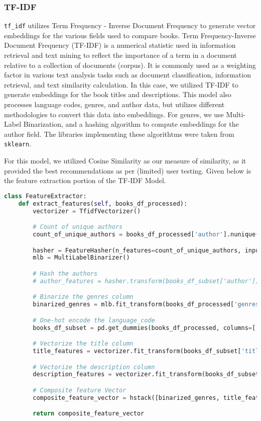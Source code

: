 \subsubsection*{TF-IDF}
\texttt{tf\_idf} utilizes Term Frequency - Inverse Document Frequency to generate vector embeddings for the various fields used to compare books. Term Frequency-Inverse Document Frequency (TF-IDF) is a numerical statistic used in information retrieval and text mining to reflect the importance of a term in a document relative to a collection of documents (corpus). It is commonly used as a weighting factor in various text analysis tasks such as document classification, information retrieval, and text similarity calculation. In this case, we utilized TF-IDF to generate embeddings for the book titles and descriptions. This model also processes language codes, genres, and author data, but utilizes different methodologies to convert this data into embeddings. For genres, we use Multi-Label Binarization, and a hashing algorithm to compute embeddings for the author field. The libraries implementing these algorithtms were taken from \texttt{sklearn}.

For this model, we utilized Cosine Similarity as our measure of similarity, as it provided the best recommendations as per (limited) user testing. Given below is the feature extraction portion of the TF-IDF Model.

\begin{lstlisting}[language=Python, caption={Feature Extraction using traditional ML}, label={lst:example}, linewidth=\linewidth, breaklines=true]
    class FeatureExtractor:
    def extract_features(self, books_df_processed):
        vectorizer = TfidfVectorizer()

        # Count of unique authors
        count_of_unique_authors = books_df_processed['author'].nunique()

        hasher = FeatureHasher(n_features=count_of_unique_authors, input_type='string')
        mlb = MultiLabelBinarizer()

        # Hash the authors
        # author_features = hasher.transform(books_df_subset['author'])

        # Binarize the genres column
        binarized_genres = mlb.fit_transform(books_df_processed['genres'])

        # One-hot encode the language_code
        books_df_subset = pd.get_dummies(books_df_processed, columns=['language_code'])

        # Vectorize the title column
        title_features = vectorizer.fit_transform(books_df_subset['title'])

        # Vectorize the description column
        description_features = vectorizer.fit_transform(books_df_subset['description'])

        # Composite feature Vector
        composite_feature_vector = hstack([binarized_genres, title_features, description_features])

        return composite_feature_vector
\end{lstlisting}

